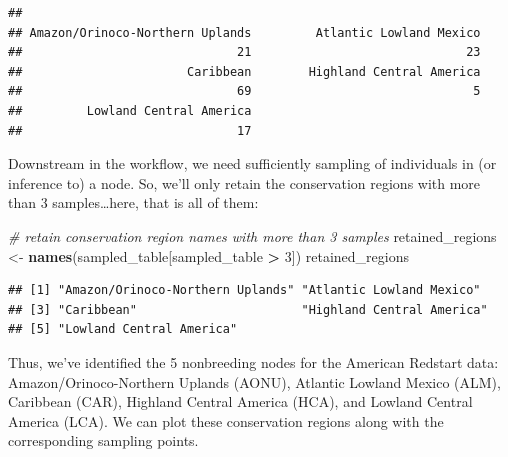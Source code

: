 \documentclass[
]{book}
\newenvironment{Shaded}{\begin{snugshade}}{\end{snugshade}}
\newcommand{\AttributeTok}[1]{\textcolor[rgb]{0.13,0.29,0.53}{#1}}
\newcommand{\CommentTok}[1]{\textcolor[rgb]{0.56,0.35,0.01}{\textit{#1}}}
\newcommand{\DecValTok}[1]{\textcolor[rgb]{0.00,0.00,0.81}{#1}}
\newcommand{\FunctionTok}[1]{\textcolor[rgb]{0.13,0.29,0.53}{\textbf{#1}}}
\newcommand{\NormalTok}[1]{#1}
\newcommand{\OtherTok}[1]{\textcolor[rgb]{0.56,0.35,0.01}{#1}}
\newcommand{\SpecialCharTok}[1]{\textcolor[rgb]{0.81,0.36,0.00}{\textbf{#1}}}
\begin{document}
\begin{verbatim}
## 
## Amazon/Orinoco-Northern Uplands         Atlantic Lowland Mexico 
##                              21                              23 
##                       Caribbean        Highland Central America 
##                              69                               5 
##         Lowland Central America 
##                              17
\end{verbatim}

Downstream in the workflow, we need sufficiently sampling of individuals in (or inference to) a node. So, we'll only retain the conservation regions with more than 3 samples\ldots here, that is all of them:

\begin{Shaded}
\begin{Highlighting}[]
\CommentTok{\# retain conservation region names with more than 3 samples}
\NormalTok{retained\_regions }\OtherTok{\textless{}{-}} \FunctionTok{names}\NormalTok{(sampled\_table[sampled\_table }\SpecialCharTok{\textgreater{}} \DecValTok{3}\NormalTok{])}
\NormalTok{retained\_regions}
\end{Highlighting}
\end{Shaded}

\begin{verbatim}
## [1] "Amazon/Orinoco-Northern Uplands" "Atlantic Lowland Mexico"        
## [3] "Caribbean"                       "Highland Central America"       
## [5] "Lowland Central America"
\end{verbatim}

Thus, we've identified the 5 nonbreeding nodes for the American Redstart data: Amazon/Orinoco-Northern Uplands (AONU), Atlantic Lowland Mexico (ALM), Caribbean (CAR), Highland Central America (HCA), and Lowland Central America (LCA). We can plot these conservation regions along with the corresponding sampling points.

\begin{Shaded}
\end{Shaded}
\end{document}
